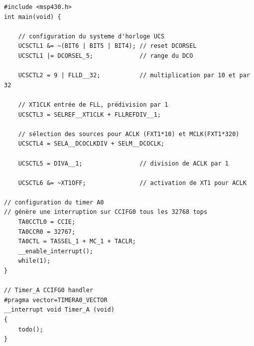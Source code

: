 \lstset{style=customc}
\begin{lstlisting}
#include <msp430.h>
int main(void) {

	// configuration du systeme d'horloge UCS
	UCSCTL1 &= ~(BIT6 | BIT5 | BIT4); // reset DCORSEL
	UCSCTL1 |= DCORSEL_5;             // range du DCO

	UCSCTL2 = 9 | FLLD__32;           // multiplication par 10 et par 32

	// XT1CLK entrée de FLL, prédivision par 1
	UCSCTL3 = SELREF__XT1CLK + FLLREFDIV__1;

	// sélection des sources pour ACLK (FXT1*10) et MCLK(FXT1*320)
	UCSCTL4 = SELA__DCOCLKDIV + SELM__DCOCLK;

	UCSCTL5 = DIVA__1;                // division de ACLK par 1

	UCSCTL6 &= ~XT1OFF;               // activation de XT1 pour ACLK

// configuration du timer A0
// génère une interruption sur CCIFG0 tous les 32768 tops
	TA0CCTL0 = CCIE;
	TA0CCR0 = 32767;
	TA0CTL = TASSEL_1 + MC_1 + TACLR;
	__enable_interrupt();
	while(1);
}

// Timer_A CCIFG0 handler
#pragma vector=TIMERA0_VECTOR
__interrupt void Timer_A (void)
{
	todo();
}
\end{lstlisting}
